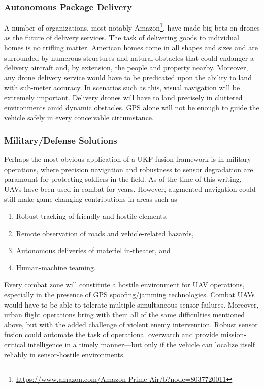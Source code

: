 \subsubsection{Autonomous Package Delivery}

A number of organizations, most notably Amazon\footnote{\url{https://www.amazon.com/Amazon-Prime-Air/b?node=8037720011}}, have made big bets on drones as the future of delivery services. The task of delivering goods to individual homes is no trifling matter. American homes come in all shapes and sizes and are surrounded by numerous structures and natural obstacles that could endanger a delivery aircraft and, by extension, the people and property nearby. Moreover, any drone delivery service would have to be predicated upon the ability to land with sub-meter accuracy. In scenarios such as this, visual navigation will be extremely important. Delivery drones will have to land precisely in cluttered environments amid dynamic obstacles. GPS alone will not be enough to guide the vehicle safely in every conceivable circumstance. 

\subsubsection{Military/Defense Solutions}

Perhaps the most obvious application of a UKF fusion framework is in military operations, where precision navigation and robustness to sensor degradation are paramount for protecting soldiers in the field. As of the time of this writing, UAVs have been used in combat for years. However, augmented navigation could still make game changing contributions in areas such as
\begin{enumerate}
    \item Robust tracking of friendly and hostile elements,
    \item Remote observation of roads and vehicle-related hazards,
    \item Autonomous deliveries of materiel in-theater, and
    \item Human-machine teaming.
\end{enumerate}
Every combat zone will constitute a hostile environment for UAV operations, especially in the presence of GPS spoofing/jamming technologies. Combat UAVs would have to be able to tolerate multiple simultaneous sensor failures. Moreover, urban flight operations bring with them all of the same difficulties mentioned above, but with the added challenge of violent enemy intervention. Robust sensor fusion could automate the task of operational overwatch and provide mission-critical intelligence in a timely manner---but only if the vehicle can localize itself reliably in sensor-hostile environments.